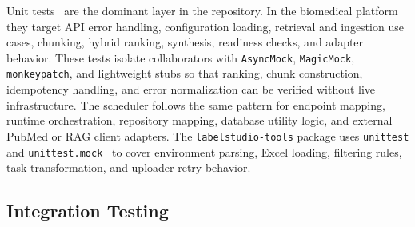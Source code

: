 Unit tests~\cite{meszaros2007xunit} are the dominant layer in the repository. In the biomedical platform they target API error handling, configuration loading, retrieval and ingestion use cases, chunking, hybrid ranking, synthesis, readiness checks, and adapter behavior. These tests isolate collaborators with \texttt{AsyncMock}, \texttt{MagicMock}, \texttt{monkeypatch}, and lightweight stubs so that ranking, chunk construction, idempotency handling, and error normalization can be verified without live infrastructure. The scheduler follows the same pattern for endpoint mapping, runtime orchestration, repository mapping, database utility logic, and external PubMed or RAG client adapters. The \texttt{labelstudio-tools} package uses \texttt{unittest} and \texttt{unittest.mock}~\cite{python2026unittest,python2026unittestmock} to cover environment parsing, Excel loading, filtering rules, task transformation, and uploader retry behavior.

\subsection{Integration Testing}

